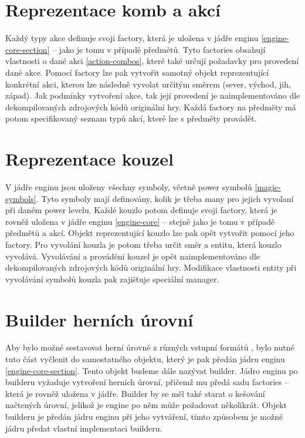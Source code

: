 \section{Reprezentace komb a akcí}
Každý typy akce definuje svoji factory, která je uložena v jádře enginu \vref{engine-core-section} -- jako je tomu v případě předmětů.
Tyto factories obsahují vlastnosti o dané akci \vref{action-combos}, které také určují požadavky pro provedení dané akce.
Pomocí factory lze pak vytvořit samotný objekt reprezentující konkrétní akci, kterou lze následně vyvolat určitým 
směrem (sever, východ, jih, západ). Jak podmínky vytvoření akce, tak její provedení je naimplementováno dle dekompilovaných
zdrojových kódů \cite{DMDecompilation} originální hry. Každá factory na předměty má potom specifikovaný seznam typů akcí,
které lze s předměty provádět.

\section{Reprezentace kouzel}
V jádře enginu jsou uloženy všechny symboly, včetně power symbolů \vref{magic-symbols}.
Tyto symboly mají definovány, kolik je třeba many pro jejich vyvolaní při daném power levelu.
Každé kouzlo potom definuje svoji factory, která je rovněž uložena v jádře enginu \vref{engine-core} -- stejně jako je tomu v případě předmětů a akcí.
Objekt reprezentující kouzlo lze pak opět vytvořit pomocí jeho factory. Pro vyvolání kouzla je potom třeba určit směr a entitu,
která kouzlo vyvolává. Vyvolávání a provádění kouzel je opět naimplementováno dle dekompilovaných
zdrojových kódů \cite{DMDecompilation} originální hry. Modifikace vlastnosti entity při vyvolávání symbolů
kouzla pak zajišťuje speciální manager. 

\section{Builder herních úrovní}

Aby bylo možné sestavovat herní úrovně z různých vstupní formátů , bylo nutné tuto část vyčlenit do samostatného
objektu, který je pak předán jádru enginu \vref{engine-core-section}. Tento objekt budeme dále nazývat builder. Jádro enginu
po builderu vyžaduje vytvoření herních úrovní, přičemž mu předá sadu factories -- která je rovněž uložena v jádře. Builder
by se měl také starat o kešování načtených úrovní, jelikož je engine po něm může požadovat několikrát. Objekt builderu
je předán jádru enginu při jeho vytváření, tímto způsobem je možné jádru předat vlastní implementaci builderu.

